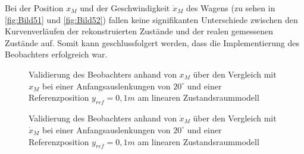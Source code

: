 Bei der Position $x_M$ und der Geschwindigkeit $\dot{x}_M$ des Wagens (zu sehen in \autoref{fig:Bild51} und \autoref{fig:Bild52}) fallen keine signifikanten Unterschiede zwischen den Kurvenverläufen der rekonstruierten Zustände und der realen \bzw gemessenen Zustände auf. Somit kann geschlussfolgert werden, dass die Implementierung des Beobachters erfolgreich war.

\begin{figure}[H]
    \centering
    \caption[Vergleich $x_M$, $\hat{x}_M$]{Validierung des Beobachters anhand von $x_M$ über den Vergleich mit $\hat{x}_M$ bei einer Anfangsauslenkungen von $20^\circ$ und einer Referenzposition $y_{ref} = 0,1 m$ am linearen Zustandsraummodell}
    \label{fig:Bild51}
\end{figure}

\begin{figure}[H]
    \centering
    \caption[Vergleich $\dot{x}_M$, $\hat{\dot{x}}_M$]{Validierung des Beobachters anhand von $\dot{x}_M$ über den Vergleich mit $\hat{\dot{x}}_M$ bei einer Anfangsauslenkungen von $20^\circ$ und einer Referenzposition $y_{ref} = 0,1 m$ am linearen Zustandsraummodell}
    \label{fig:Bild52}
\end{figure}

